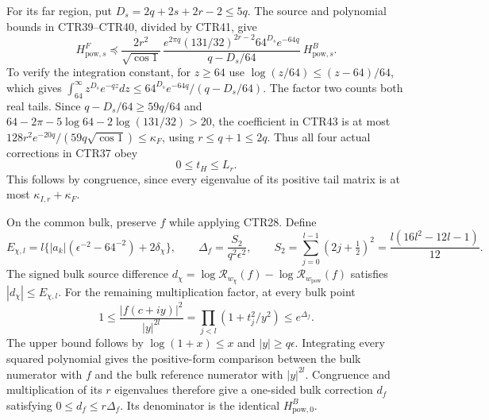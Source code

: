 \documentclass[11pt,a4paper]{article}
\begin{document}
For its far region, put $D_s=2q+2s+2r-2\leq5q$.
The source and polynomial bounds in CTR39--CTR40, divided by CTR41,
give
\[
 H_{\mathrm{pow},s}^F\preceq
 \frac{2r^2}{\sqrt{\cos1}}\,
 \frac{e^{2\pi q}(131/32)^{2r-2}64^{D_s}e^{-64q}}
      {q-D_s/64}\ H_{\mathrm{pow},s}^B.
 \tag{CTR43}
\]
To verify the integration constant, for $z\geq64$ use
$\log(z/64)\leq(z-64)/64$, which gives
$\int_{64}^\infty z^{D_s}e^{-qz}dz
\leq64^{D_s}e^{-64q}/(q-D_s/64)$.
The factor two counts both real tails. Since
$q-D_s/64\geq59q/64$ and
$64-2\pi-5\log64-2\log(131/32)>20$, the coefficient in CTR43 is
at most
$128r^2e^{-20q}/(59q\sqrt{\cos1})\leq\kappa_F$,
using $r\leq q+1\leq2q$.
Thus all four actual corrections in CTR37 obey
\[
 0\leq t_H\leq L_r.
 \tag{CTR44}
\]
This follows by congruence, since every eigenvalue of its positive
tail matrix is at most $\kappa_{I,r}+\kappa_F$.

On the common bulk, preserve $f$ while applying CTR28. Define
\[
 E_{\chi,l}
   =l\{|a_k|(\epsilon^{-2}-64^{-2})+2\delta_\chi\},\qquad
 \Delta_f=\frac{S_2}{q^2\epsilon^2},\qquad
 S_2=\sum_{j=0}^{l-1}(2j+\tfrac12)^2
     =\frac{l(16l^2-12l-1)}{12}.
 \tag{CTR45}
\]
The signed bulk source difference
$d_\chi=\log\mathcal R_{w_\chi}(f)
       -\log\mathcal R_{w_{\mathrm{pow}}}(f)$ satisfies
$|d_\chi|\leq E_{\chi,l}$.
For the remaining multiplication factor, at every bulk point
\[
 1\leq\frac{|f(c+iy)|^2}{|y|^{2l}}
       =\prod_{j<l}(1+t_j^2/y^2)\leq e^{\Delta_f}.
 \tag{CTR46}
\]
The upper bound follows by $\log(1+x)\leq x$ and $|y|\geq q\epsilon$.
Integrating every squared polynomial gives the positive-form comparison
between the bulk numerator with $f$ and the bulk reference numerator
with $|y|^{2l}$. Congruence and multiplication of its $r$ eigenvalues
therefore give a one-sided bulk correction $d_f$ satisfying
$0\leq d_f\leq r\Delta_f$. Its denominator is the identical
$H_{\mathrm{pow},0}^B$.
\end{document}
